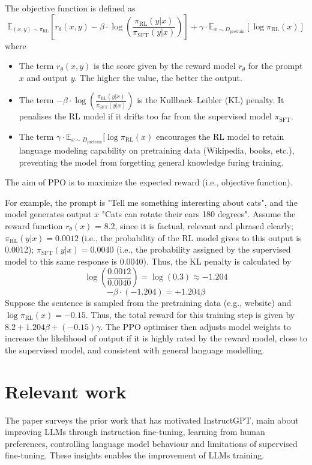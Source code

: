\documentclass{article} %
\begin{document}
The objective function is defined as 
\[
\mathbb{E}_{(x,y) \sim \pi_{\text{RL}}} \left[ r_\theta(x, y) - \beta \cdot \log \left( \frac{\pi_{\text{RL}}(y|x)}{\pi_{\text{SFT}}(y|x)} \right) \right] + \gamma \cdot \mathbb{E}_{x \sim D_{\text{pretrain}}} \left[ \log \pi_{\text{RL}}(x) \right]
\]
where
\begin{itemize}
    \item The term \(r_\theta(x, y)\) is the score given by the reward model \(r_\theta\) for the prompt \(x\) and output \(y\). The higher the value, the better the output.
    \item The term \(- \beta \cdot \log \left( \frac{\pi_{\text{RL}}(y|x)}{\pi_{\text{SFT}}(y|x)} \right) \) is the Kullback–Leibler (KL) penalty. It penalises the RL model if it drifts too far from the supervised model \(\pi_{\text{SFT}}\). 
    \item The term \(\gamma \cdot \mathbb{E}_{x \sim D_{\text{pretrain}}}[ \log \pi_{\text{RL}}(x)\) encourages the RL model to retain language modeling capability on pretraining data (Wikipedia, books, etc.), preventing the model from forgetting general knowledge furing training.

\end{itemize}
The aim of PPO is to maximize the expected reward (i.e., objective function).

For example, the prompt is "Tell me something interesting about cats", and the model generates output \(x\) "Cats can rotate their ears 180 degrees". Assume the reward function \(r_\theta (x)\) = 8.2, since it is factual, relevant and phrased clearly;  \(\pi_{\text{RL}}(y|x) = 0.0012\) (i.e., the probability of the RL model gives to this output is 0.0012); \(\pi_{\text{SFT}}(y|x) = 0.0040\) (i.e., the probability assigned by the supervised model to this same response is 0.0040). Thus, the KL penalty is calculated by \[
\log \left( \frac{0.0012}{0.0040} \right) = \log(0.3) \approx -1.204
\]
\[
-\beta \cdot (-1.204) = +1.204\beta
\]
Suppose the sentence is sampled from the pretraining data (e.g., website) and \(\log \pi_{\text{RL}}(x) = -0.15\). Thus, the total reward for this training step is given by \(8.2 +1.204\beta + (-0.15)\gamma\). The PPO optimiser then adjusts model weights to increase the likelihood of output if it is highly rated by the reward model, close to the supervised model, and consistent with general language modelling. 

\section{Relevant work}
The paper surveys the prior work that has motivated InstructGPT, main about improving LLMs through instruction fine-tuning, learning from human preferences, controlling language model behaviour and limitations of supervised fine-tuning. These insights enables the improvement of LLMs training.
\end{document}
